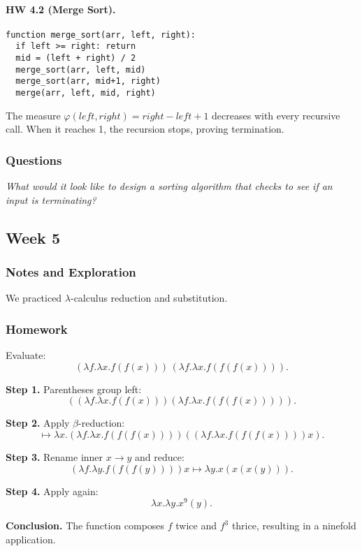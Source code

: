 \documentclass[11pt]{article}
\begin{document}
\paragraph{HW 4.2 (Merge Sort).}
\begin{verbatim}
function merge_sort(arr, left, right):
  if left >= right: return
  mid = (left + right) / 2
  merge_sort(arr, left, mid)
  merge_sort(arr, mid+1, right)
  merge(arr, left, mid, right)
\end{verbatim}
The measure $\varphi(left,right)=right-left+1$ decreases with every recursive call.  
When it reaches 1, the recursion stops, proving termination.

\subsubsection{Questions}
\emph{What would it look like to design a sorting algorithm that checks to see if an input is terminating?}

\subsection{Week 5}

\subsubsection{Notes and Exploration}
We practiced $\lambda$-calculus reduction and substitution.

\subsubsection{Homework}
Evaluate:
\[
  (\lambda f.\lambda x.f(f(x)))\,(\lambda f.\lambda x.f(f(f(x)))).
\]

\textbf{Step 1.} Parentheses group left:  
\[
  ((\lambda f.\lambda x.f(f(x)))(\lambda f.\lambda x.f(f(f(x))))).
\]

\textbf{Step 2.} Apply $\beta$-reduction:  
\[
  \mapsto \lambda x.(\lambda f.\lambda x.f(f(f(x))))((\lambda f.\lambda x.f(f(f(x))))x).
\]

\textbf{Step 3.} Rename inner $x\to y$ and reduce:  
\[
  (\lambda f.\lambda y.f(f(f(y))))x \mapsto \lambda y.x(x(x(y))).
\]

\textbf{Step 4.} Apply again:  
\[
  \lambda x.\lambda y.x^9(y).
\]

\textbf{Conclusion.}  
The function composes $f$ twice and $f^3$ thrice, resulting in a ninefold application.
\end{document}
